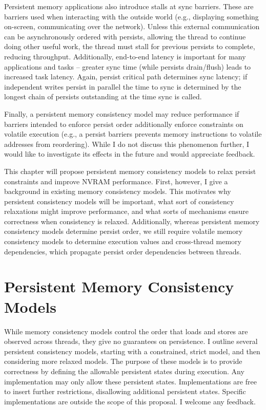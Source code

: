 Persistent memory applications also introduce stalls at sync barriers.
These are barriers used when interacting with the outside world (e.g., displaying something on-screen, communicating over the network).
Unless this external communication can be asynchronously ordered with persists, allowing the thread to continue doing other useful work, the thread must stall for previous persists to complete, reducing throughput.
Additionally, end-to-end latency is important for many applications and tasks -- greater sync time (while persists drain/flush) leads to increased task latency.
Again, persist critical path determines sync latency; if independent writes persist in parallel the time to sync is determined by the longest chain of persists outstanding at the time sync is called.

Finally, a persistent memory consistency model may reduce performance if barriers intended to enforce persist order additionally enforce constraints on volatile execution (e.g., a persist barriers prevents memory instructions to volatile addresses from reordering).
While I do not discuss this phenomenon further, I would like to investigate its effects in the future and would appreciate feedback.

This chapter will propose persistent memory consistency models to relax persist constraints and improve NVRAM performance.
First, however, I give a background in existing memory consistency models.
This motivates why persistent consistency models will be important, what sort of consistency relaxations might improve performance, and what sorts of mechanisms ensure correctness when consistency is relaxed.
Additionally, whereas persistent memory consistency models determine persist order, we still require volatile memory consistency models to determine execution values and cross-thread memory dependencies, which propagate persist order dependencies between threads.


\section{Persistent Memory Consistency Models}
\label{sec:PMC:PersistenceModels}

While memory consistency models control the order that loads and stores are observed across threads, they give no guarantees on persistence.
I outline several persistent consistency models, starting with a constrained, strict model, and then considering more relaxed models.
The purpose of these models is to provide correctness by defining the allowable persistent states during execution.
Any implementation may only allow these persistent states.
Implementations are free to insert further restrictions, disallowing additional persistent states.
Specific implementations are outside the scope of this proposal.
I welcome any feedback.

